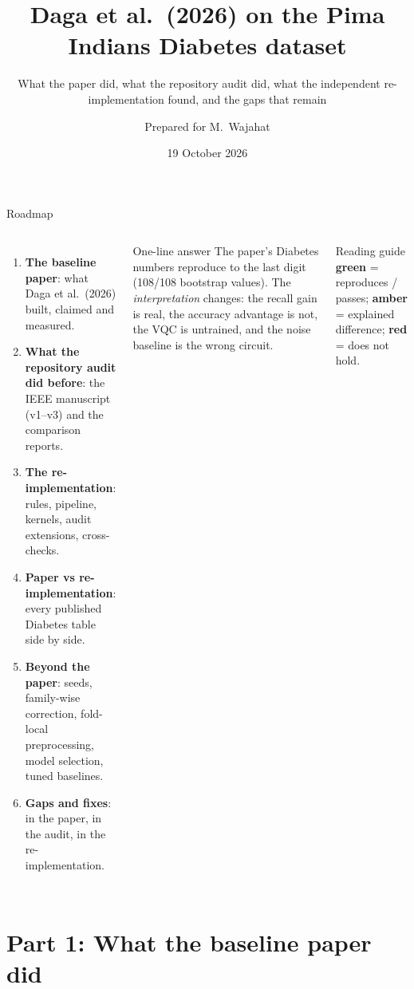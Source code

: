 \documentclass[aspectratio=169,10pt,t,xcolor={table}]{beamer}
\title[Daga et al.\ (2026) on Diabetes: re-implementation and verification]{Daga et al.\ (2026) on the Pima Indians Diabetes dataset}
\subtitle{What the paper did, what the repository audit did, what the independent re-implementation found, and the gaps that remain}
\author[M.~Wajahat]{Prepared for M.~Wajahat}
\institute[]{Repository \texttt{Adaptive-Quantum-Kernel-Selection}, code in \texttt{reimplementation/}}
\date{19 October 2026}
\newcommand{\ok}[1]{\textcolor{qgreen}{\textbf{#1}}}
\newcommand{\bad}[1]{\textcolor{qred}{\textbf{#1}}}
\newcommand{\warn}[1]{\textcolor{qamber}{\textbf{#1}}}
\begin{document}
\begin{frame}[plain]
\titlepage
\end{frame}

\begin{frame}{Roadmap}
\begin{columns}[T]
\begin{enumerate}
  \item \textbf{The baseline paper}: what Daga et al.\ (2026) built, claimed and measured.
  \item \textbf{What the repository audit did before}: the IEEE manuscript (v1--v3) and the comparison reports.
  \item \textbf{The re-implementation}: rules, pipeline, kernels, audit extensions, cross-checks.
  \item \textbf{Paper vs re-implementation}: every published Diabetes table side by side.
  \item \textbf{Beyond the paper}: seeds, family-wise correction, fold-local preprocessing, model selection, tuned baselines.
  \item \textbf{Gaps and fixes}: in the paper, in the audit, in the re-implementation.
\end{enumerate}
\begin{block}{One-line answer}
The paper's Diabetes numbers reproduce to the last digit (108/108 bootstrap values). The \emph{interpretation} changes: the recall gain is real, the accuracy advantage is not, the VQC is untrained, and the noise baseline is the wrong circuit.
\end{block}
\begin{exampleblock}{Reading guide}
\ok{green} = reproduces / passes; \warn{amber} = explained difference; \bad{red} = does not hold.
\end{exampleblock}
\end{columns}
\end{frame}

\section{Part 1: What the baseline paper did}
\end{document}

